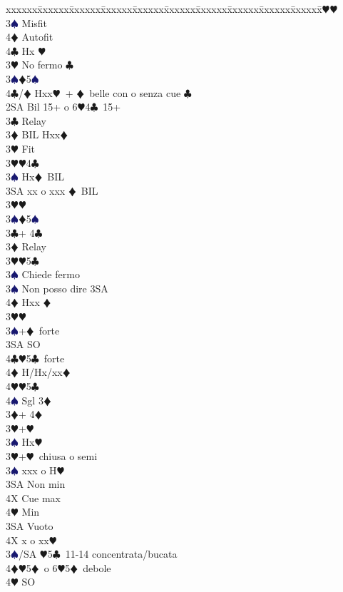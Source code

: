 \documentclass[a4paper,italian]{article}
\newcommand{\BC}{\textcolor{OliveGreen}{$\clubsuit$}}
\newcommand{\BD}{\textcolor{RedOrange}{$\vardiamondsuit$}}
\newcommand{\BH}{\textcolor{Red2}{$\varheartsuit${}}}
\newcommand{\BS}{\textcolor{MidnightBlue}{$\spadesuit${}}}
\newenvironment{bidtable}
{\begin{tabbing}

    xxxxxx\=xxxxxx\=xxxxxx\=xxxxxx\=xxxxxx\=xxxxxx\=xxxxxx\=xxxxxx\=xxxxxx\=xxxxxx\=\kill}
{\end{tabbing} }%
\begin{document}
\begin{multicols}{2}
\begin{bidtable}
        3\BH {}\BH \+\\
        3\BS \> Misfit\\
        4\BD \> Autofit\\
        4\BC \> Hx \BH \-\-\\
        3\BH \> No fermo \BC \\
        3\BS {}\BD 5\BS \\
        4\BC/\BD \> Hxx\BH\ + \BD\ belle con o senza cue \BC\-\\
        2SA \> Bil 15+ o 6\BH 4\BC\ 15+\+\\
        3\BC \> Relay\+\\
        3\BD \> BIL Hxx\BD \+\\
        3\BH \> Fit\-\\
        3\BH {}\BH 4\BC \\
        3\BS \> Hx\BD\ BIL\\
        3SA \> xx o xxx \BD\ BIL\-\\
        3\BH {}\BH \\
        3\BS {}\BD 5\BS \-\\
        3\BC {}+ 4\BC \+\\
        3\BD \> Relay\+\\
        3\BH {}\BH 5\BC \+\\
        3\BS \> Chiede fermo\-\\
        3\BS \> Non posso dire 3SA\\
        4\BD \> Hxx \BD \-\\
        3\BH {}\BH \\
        3\BS {}+\BD\ forte\+\\
        3SA \> SO\\
        4\BC {}\BH 5\BC\ forte\\
        4\BD \> H/Hx/xx\BD \\
        4\BH {}\BH 5\BC \\
        4\BS \> Sgl 3\BD \-\-\\
        3\BD {}+ 4\BD \+\\
        3\BH {}+\BH \\
        3\BS \> Hx\BH \-\\
        3\BH {}+\BH\ chiusa o semi\+\\
        3\BS \> xxx o H\BH \+\\
        3SA \> Non min\\
        4X \> Cue max\\
        4\BH \> Min\-\\
        3SA \> Vuoto\\
        4X \> x o xx\BH \-\\
        3\BS/SA \BH 5\BC\ 11-14 concentrata/bucata\\
        4\BD {}\BH5\BD\ o 6\BH5\BD\ debole\+\\
        4\BH \> SO
    \end{bidtable}
\end{multicols}
\end{document}
